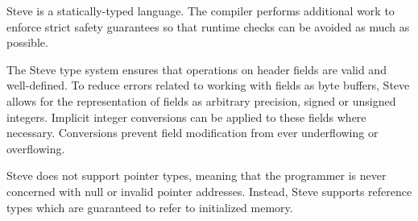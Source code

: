 Steve is a statically-typed language. The compiler performs additional work to
enforce strict safety guarantees so that runtime checks can be avoided as much as possible.

The Steve type system ensures that operations on header fields are valid and
well-defined. 
To reduce errors related to working with fields as byte buffers, Steve allows
for the representation of fields as arbitrary precision, signed or unsigned integers.
Implicit integer conversions can be applied to these fields where necessary.
Conversions prevent field modification from ever underflowing or overflowing.

Steve does not support pointer types, meaning that the programmer is never
concerned with null or invalid pointer addresses. Instead, Steve supports reference
types which are guaranteed to refer to initialized memory.

%
%
%


%
%
%
%
%
%

